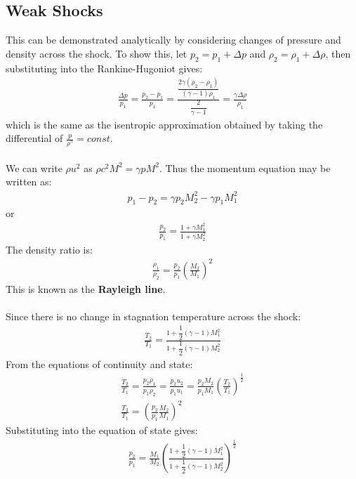 \subsection{Weak Shocks}
This can be demonstrated analytically by considering changes of pressure and density across the shock.
To show this, let $p_2 = p_1 + \Delta p$ and $\rho_2 = \rho_1 + \Delta \rho$, then substituting into the Rankine-Hugoniot gives:
\begin{gather}
    \frac{\Delta p}{p_1} = \frac{p_2-p_1}{p_1} = \frac{\dfrac{2\gamma(\rho_2-\rho_1)}{(\gamma-1)\rho_1}}{\dfrac{2}{\gamma-1}} = \frac{\gamma\Delta \rho}{\rho_1}
\end{gather}
which is the same as the isentropic approximation obtained by taking the differential of $\frac{p}{\rho^\gamma} = const.$
\\\\
We can write $\rho u^2$ as $\rho c^2 M^2 = \gamma p M^2$.
Thus the momentum equation may be written as:
\begin{gather}
    p_1 - p_2 = \gamma p_2 M_2^2 - \gamma p_1 M_1^2
\end{gather}
or
\begin{gather}
    \frac{p_2}{p_1} = \frac{1+\gamma M_1^2}{1+\gamma M_2^2}
\end{gather}
The density ratio is:
\begin{gather}
    \frac{\rho_1}{\rho_2} = \frac{p_2}{p_1} \left( \frac{M_2}{M_1} \right)^2
\end{gather}
This is known as the \textbf{Rayleigh line}.
\\\\
Since there is no change in stagnation temperature across the shock:
\begin{gather}
    \frac{T_2}{T_1} = \frac{1+\dfrac{1}{2}(\gamma-1)M_1^2}{1+\dfrac{1}{2}(\gamma-1)M_2^2}
\end{gather}
From the equations of continuity and state:
\begin{gather}
    \frac{T_2}{T_1} = \frac{p_2 \rho_1}{p_1 \rho_2} = \frac{p_2 u_2}{p_1 u_1} = \frac{p_2 M_2}{p_1 M_1} \left(\frac{T_2}{T_1}\right)^{\frac{1}{2}} \\[5pt]
    \frac{T_2}{T_1} = \left( \frac{p_2}{p_1} \frac{M_2}{M_1} \right)^2
\end{gather}
Substituting into the equation of state gives:
\begin{gather}
    \frac{p_2}{p_1} = \frac{M_1}{M_2} \left( \frac{1+\dfrac{1}{2}(\gamma-1)M_1^2}{1+\dfrac{1}{2}(\gamma-1)M_2^2} \right)^{\frac{1}{2}}
\end{gather}
